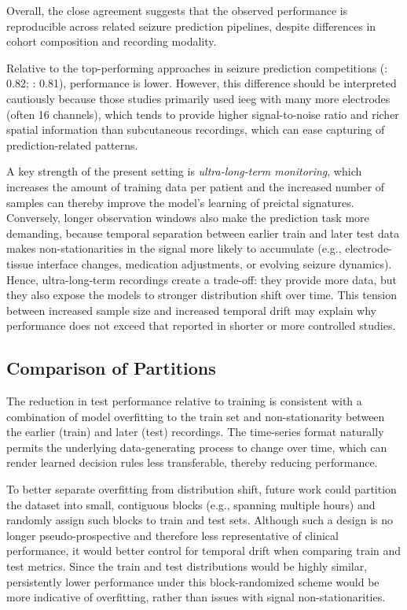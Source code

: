 Overall, the close agreement suggests that the observed performance is reproducible across related seizure prediction pipelines, despite differences in cohort composition and recording modality.

Relative to the top-performing approaches in seizure prediction competitions (\textcite{brinkmann_crowdsourcing_2016}: \num{0.82}; \textcite{kuhlmann_seizure_2018}: \num{0.81}), performance is lower.
However, this difference should be interpreted cautiously because those studies primarily used \gls{ieeg} with many more electrodes (often 16 channels), which tends to provide higher signal-to-noise ratio and richer spatial information than subcutaneous recordings, which can ease capturing of prediction-related patterns.

A key strength of the present setting is \textit{ultra-long-term monitoring}, which increases the amount of training data per patient and the increased number of samples can thereby improve the model's learning of preictal signatures.
Conversely, longer observation windows also make the prediction task more demanding, because temporal separation between earlier train and later test data makes non-stationarities in the signal more likely to accumulate (e.g., electrode-tissue interface changes, medication adjustments, or evolving seizure dynamics).
Hence, ultra-long-term recordings create a trade-off: they provide more data, but they also expose the models to stronger distribution shift over time.
This tension between increased sample size and increased temporal drift may explain why performance does not exceed that reported in shorter or more controlled studies.

\subsection{Comparison of Partitions}
The reduction in test performance relative to training is consistent with a combination of model overfitting to the train set and non-stationarity between the earlier (train) and later (test) recordings.
The time-series format naturally permits the underlying data-generating process to change over time, which can render learned decision rules less transferable, thereby reducing performance.

To better separate overfitting from distribution shift, future work could partition the dataset into small, contiguous blocks (e.g., spanning multiple hours) and randomly assign such blocks to train and test sets.
Although such a design is no longer pseudo-prospective and therefore less representative of clinical performance, it would better control for temporal drift when comparing train and test metrics.
Since the train and test distributions would be highly similar, persistently lower performance under this block-randomized scheme would be more indicative of overfitting, rather than issues with signal non-stationarities.

